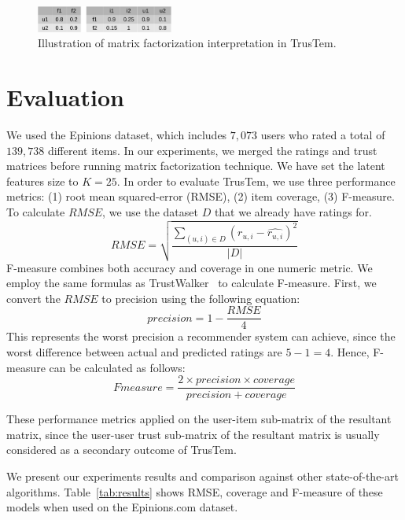 \documentclass[11pt, conference, onecolumn]{IEEEtran}
\begin{document}
\begin{figure}[tp]
\centering
\includegraphics[width=0.4\textwidth]{example}
\caption{Illustration of matrix factorization interpretation in TrusTem.}
\label{fig:mf_example}
\end{figure}

\section{Evaluation}
We used the Epinions dataset, which includes $7,073$ users who rated a total of $139,738$ different items. In our experiments, we merged the ratings and trust matrices before running matrix factorization technique. We have set the latent features size to $K = 25$. In order to evaluate TrusTem, we use three performance metrics: (1) root mean squared-error (RMSE), (2) item coverage, (3) F-measure.
To calculate $RMSE$, we use the dataset $D$ that we already have ratings for.
\begin{equation}
RMSE = \sqrt{\frac{\sum_{(u,i)\in D}\left(r_{u,i} - \widehat{r_{u,i}} \right)^2}{|D|}}
\end{equation}
F-measure combines both accuracy and coverage in one numeric metric. We employ the same formulas as TrustWalker~\cite{Jamali:2009} to calculate F-measure. First, we convert the $RMSE$ to precision using the following equation:
\begin{equation}
precision = 1 - \frac{RMSE}{4}
\end{equation}
This represents the worst precision a recommender system can achieve, since the worst difference between actual and predicted ratings are $5-1 = 4$. Hence, F-measure can be calculated as follows:
\begin{equation}
Fmeasure = \frac{2\times precision \times coverage}{precision + coverage}
\end{equation}

These performance metrics applied on the user-item sub-matrix of the resultant matrix, since the user-user trust sub-matrix of the resultant matrix is usually considered as a secondary outcome of TrusTem.

We present our experiments results and comparison against other state-of-the-art algorithms. Table~\ref{tab:results} shows RMSE, coverage and F-measure of these models when used on the Epinions.com dataset. 
\end{document}
